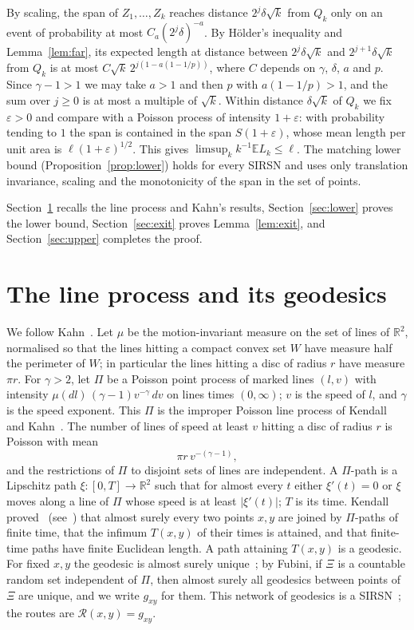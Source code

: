 \documentclass[11pt]{amsart}
\theoremstyle{remark}
\newcommand{\R}{\mathbb{R}}
\newcommand{\E}{\mathbb{E}}
\begin{document}
By scaling, the span of $Z_1,\dots,Z_k$ reaches distance $2^j\delta\sqrt k$ from
$Q_k$ only on an event of probability at most $C_a(2^j\delta)^{-a}$. By H\"older's inequality and Lemma~\ref{lem:far}, its
expected length at distance between $2^j\delta\sqrt k$ and $2^{j+1}\delta\sqrt k$ from $Q_k$ is at most
$C\sqrt k\,2^{j(1-a(1-1/p))}$, where $C$ depends on $\gamma$, $\delta$, $a$ and $p$. Since $\gamma-1>1$ we may take
$a>1$ and then $p$ with $a(1-1/p)>1$, and the sum over $j\ge0$ is at most a multiple of $\sqrt k$. Within distance $\delta\sqrt k$
of $Q_k$ we fix $\varepsilon>0$ and compare with a Poisson process of intensity $1+\varepsilon$: with probability tending to $1$ the span is
contained in the span $S(1+\varepsilon)$, whose mean length per unit area is $\ell(1+\varepsilon)^{1/2}$. This gives
$\limsup_kk^{-1}\E L_k\le\ell$. The matching lower bound (Proposition~\ref{prop:lower}) holds for every SIRSN and
uses only translation invariance, scaling and the monotonicity of the span in the set of points.

Section~\ref{sec:model} recalls the line process and Kahn's results, Section~\ref{sec:lower} proves the lower bound,
Section~\ref{sec:exit} proves Lemma~\ref{lem:exit}, and Section~\ref{sec:upper} completes the proof.

\section{The line process and its geodesics}\label{sec:model}

We follow Kahn~\cite[Section~2]{Kahn}. Let $\mu$ be the
motion-invariant measure on the set of lines of $\R^2$, normalised so that the lines hitting a compact convex set $W$
have measure half the perimeter of $W$; in particular the lines hitting a disc of radius $r$ have measure $\pi r$. For
$\gamma>2$, let $\Pi$ be a Poisson point process of marked lines $(l,v)$ with intensity
$\mu(dl)\,(\gamma-1)v^{-\gamma}\,dv$ on lines times $(0,\infty)$; $v$ is the speed of $l$, and $\gamma$ is the speed
exponent. This $\Pi$ is the improper Poisson line process of Kendall~\cite{Kendall} and Kahn~\cite{Kahn}. The number of
lines of speed at least $v$ hitting a disc of radius $r$ is Poisson with mean
\begin{equation}\label{eq:count}
\pi r\,v^{-(\gamma-1)},
\end{equation}
and the restrictions of $\Pi$ to disjoint sets of lines are independent. A $\Pi$-path is a Lipschitz path
$\xi:[0,T]\to\R^2$ such that for almost every $t$ either $\xi'(t)=0$ or $\xi$ moves along a line of $\Pi$ whose speed
is at least $|\xi'(t)|$; $T$ is its time. Kendall proved~\cite{Kendall} (see~\cite[Theorem~2.4]{Kahn}) that almost
surely every two points $x,y$ are joined by $\Pi$-paths of finite time, that the infimum $T(x,y)$ of their times is
attained, and that finite-time paths have finite Euclidean length. A path attaining $T(x,y)$ is a geodesic. For fixed
$x,y$ the geodesic is almost surely unique~\cite[Theorem~4.4]{Kendall}; by Fubini, if $\Xi$ is a countable random set
independent of $\Pi$, then almost surely all geodesics between points of $\Xi$ are unique, and we write $g_{xy}$ for
them. This network of geodesics is a SIRSN~\cite[Theorem~6.2]{Kahn}; the routes are $\mathcal R(x,y)=g_{xy}$.
\end{document}
